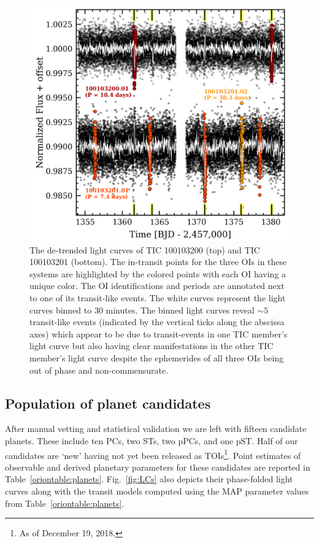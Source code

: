 \begin{figure}
  \centering
  \includegraphics[width=0.8\hsize]{figures/TIC300_LC.png}
  \caption[Example of scattered light within the common aperture of nearby TICs.]
          {The de-trended light curves of TIC 100103200 (top) and TIC 100103201 (bottom).
    The in-transit points for the three
    OIs in these systems are highlighted by the colored points with each OI having a unique color.
    The OI identifications and periods are annotated next to one of its transit-like events.
    The white curves represent the light curves binned to 30 minutes. The binned light curves reveal
    $\sim 5$ transit-like events (indicated by the vertical ticks along the abscissa axes) which appear to be
    due to transit-events in one TIC member's light curve but also having clear manifestations in the other
    TIC member's light curve despite the ephemerides of all three OIs being out of phase and non-commensurate.}
  \label{fig:tic300}
\end{figure}

\subsection{Population of planet candidates}
After manual vetting and statistical validation we are left with fifteen candidate planets. These include
ten PCs, two STs, two pPCs, and one pST. Half of our candidates are `new' having not yet been released
as TOIs\footnote{As of December 19, 2018.}.
Point estimates of observable and derived planetary parameters for these candidates are reported in
Table~\ref{oriontable:planets}.  Fig.~\ref{fig:LCs} also depicts their phase-folded light curves along with
the transit models computed using the MAP parameter values from Table~\ref{oriontable:planets}. \\

